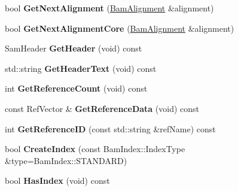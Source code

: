 \begin{DoxyCompactItemize}
\item 
\hypertarget{classBamTools_1_1BamReader_aa0ac6312a6f5c14990cbb4acaafd90e9}{bool {\bfseries Get\-Next\-Alignment} (\hyperlink{structBamTools_1_1BamAlignment}{Bam\-Alignment} \&alignment)}\label{classBamTools_1_1BamReader_aa0ac6312a6f5c14990cbb4acaafd90e9}

\item 
\hypertarget{classBamTools_1_1BamReader_a264b66ebc16576b5bfbd19524c180ea2}{bool {\bfseries Get\-Next\-Alignment\-Core} (\hyperlink{structBamTools_1_1BamAlignment}{Bam\-Alignment} \&alignment)}\label{classBamTools_1_1BamReader_a264b66ebc16576b5bfbd19524c180ea2}

\item 
\hypertarget{classBamTools_1_1BamReader_a6b378ff1e9a5bf50d4521067d711a21f}{Sam\-Header {\bfseries Get\-Header} (void) const }\label{classBamTools_1_1BamReader_a6b378ff1e9a5bf50d4521067d711a21f}

\item 
\hypertarget{classBamTools_1_1BamReader_a3bff47451f42f7237ba6a9722ab3bcda}{std\-::string {\bfseries Get\-Header\-Text} (void) const }\label{classBamTools_1_1BamReader_a3bff47451f42f7237ba6a9722ab3bcda}

\item 
\hypertarget{classBamTools_1_1BamReader_a0b5b8bf6055a0505ecb6dbae5e5914a6}{int {\bfseries Get\-Reference\-Count} (void) const }\label{classBamTools_1_1BamReader_a0b5b8bf6055a0505ecb6dbae5e5914a6}

\item 
\hypertarget{classBamTools_1_1BamReader_a8d65d5b1f2dd2b995982830fc10b4d04}{const Ref\-Vector \& {\bfseries Get\-Reference\-Data} (void) const }\label{classBamTools_1_1BamReader_a8d65d5b1f2dd2b995982830fc10b4d04}

\item 
\hypertarget{classBamTools_1_1BamReader_ac860ef48a07d6c1584a5d163755264fd}{int {\bfseries Get\-Reference\-I\-D} (const std\-::string \&ref\-Name) const }\label{classBamTools_1_1BamReader_ac860ef48a07d6c1584a5d163755264fd}

\item 
\hypertarget{classBamTools_1_1BamReader_a13a4fa81aa1b91da054037ce0790b4f0}{bool {\bfseries Create\-Index} (const Bam\-Index\-::\-Index\-Type \&type=Bam\-Index\-::\-S\-T\-A\-N\-D\-A\-R\-D)}\label{classBamTools_1_1BamReader_a13a4fa81aa1b91da054037ce0790b4f0}

\item 
\hypertarget{classBamTools_1_1BamReader_ae52d2df814b8f70bc53b16633412bc14}{bool {\bfseries Has\-Index} (void) const }\label{classBamTools_1_1BamReader_ae52d2df814b8f70bc53b16633412bc14}


\end{DoxyCompactItemize}
